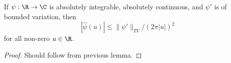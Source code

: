 \begin{lemma}
\label{prelim-decay-3}
\leanok
If $\psi:\R \to \C$ is absolutely integrable, absolutely continuous, and $\psi'$ is of bounded
variation, then
$$ |\hat \psi(u)| \leq \| \psi' \|_{TV} / (2\pi |u|)^2$$
for all non-zero $u \in \R$.
\end{lemma}
\begin{proof}
Should follow from previous lemma.
\end{proof}
